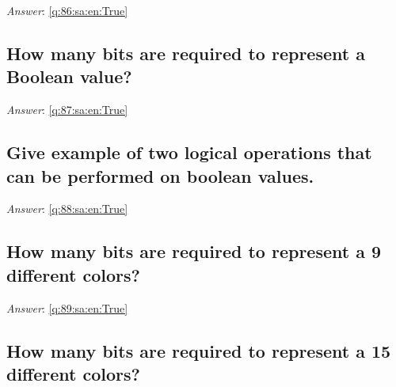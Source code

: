 \documentclass[a4paper,11pt,oneside]{article}
\begin{document}
\begin{sloppypar}
\vspace{1cm}

\textit{Answer}: \autoref{q:86:sa:en:True}



\subsection{How many bits are required to represent a Boolean value?}

\label{q:87:sa:en:False}

\vspace{2cm}

\noindent\makebox[\textwidth]{\hrulefill}

\vspace{1cm}

\textit{Answer}: \autoref{q:87:sa:en:True}



\subsection{Give example of two logical operations that can be performed on boolean values.}

\label{q:88:sa:en:False}

\vspace{2cm}

\noindent\makebox[\textwidth]{\hrulefill}

\vspace{1cm}

\textit{Answer}: \autoref{q:88:sa:en:True}



\subsection{How many bits are required to represent a 9 different colors?}

\label{q:89:sa:en:False}

\vspace{2cm}

\noindent\makebox[\textwidth]{\hrulefill}

\vspace{1cm}

\textit{Answer}: \autoref{q:89:sa:en:True}



\subsection{How many bits are required to represent a 15 different colors?}


\end{sloppypar}
\end{document}
